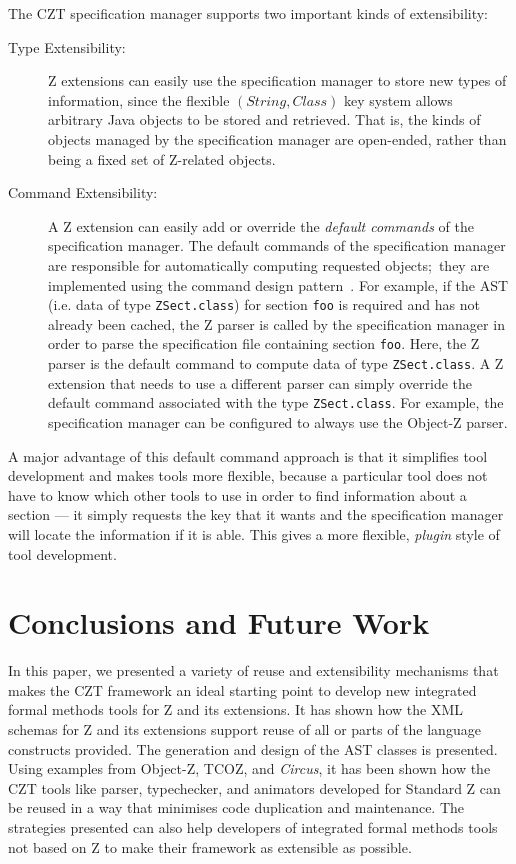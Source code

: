 \documentclass{llncs}
\newcommand{\Circus}{{\sf\slshape Circus}}
\newcommand{\Interface}[1]{\texttt{#1}}
\begin{document}
  The CZT specification manager supports two important kinds of
  extensibility:
  \begin{description}
  \item[Type Extensibility:] Z extensions can easily use the
    specification manager to store new types of information, since the
    flexible $(String,Class)$ key system allows arbitrary Java objects
    to be stored and retrieved.  That is, the kinds of objects managed
    by the specification manager are open-ended, rather than being a
    fixed set of Z-related objects.
  \item[Command Extensibility:] A Z extension can easily add or
    override the \emph{default commands} of the specification manager.
    The default commands of the specification manager are responsible
    for automatically computing requested objects;~they are
    implemented using the command design pattern~\cite{GamEA:95}. For
    example, if the AST (i.e. data of type \Interface{ZSect.class})
    for section \texttt{foo} is required and has not already been
    cached, the Z parser is called by the specification manager in
    order to parse the specification file containing section
    \texttt{foo}.  Here, the Z parser is the default command to
    compute data of type \Interface{ZSect.class}.  A Z extension that
    needs to use a different parser can simply override the default
    command associated with the type \Interface{ZSect.class}.  For
    example, the specification manager can be configured to always use
    the Object-Z parser.
    \end{description}

  A major advantage of this default command approach is that it
  simplifies tool development and makes tools more flexible, because a
  particular tool does not have to know which other tools to use in
  order to find information about a section --- it simply requests the
  key that it wants and the specification manager will locate the
  information if it is able.  This gives a more flexible,
  \emph{plugin} style of tool development.

\section{Conclusions and Future Work} \label{sec:conclusions}

  In this paper, we presented a variety of reuse and extensibility
  mechanisms that makes the CZT framework an ideal starting point to
  develop new integrated formal methods tools for Z and its
  extensions.  It has shown how the XML schemas for Z and its
  extensions support reuse of all or parts of the language constructs
  provided.  The generation and design of the AST classes is
  presented.  Using examples from Object-Z, TCOZ, and \Circus, it has
  been shown how the CZT tools like parser, typechecker, and animators
  developed for Standard Z can be reused in a way that minimises code
  duplication and maintenance.  The strategies presented can also help
  developers of integrated formal methods tools not based on Z to make
  their framework as extensible as possible.
\end{document}
